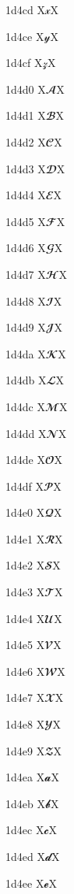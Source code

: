 \documentclass[11pt]{article}
\begin{document}
1d4cd X{\ensuremath{\mathscr{x}}}X

1d4ce X{\ensuremath{\mathscr{y}}}X

1d4cf X{\ensuremath{\mathscr{z}}}X

1d4d0 X{\ensuremath{\mathbfscr{A}}}X

1d4d1 X{\ensuremath{\mathbfscr{B}}}X

1d4d2 X{\ensuremath{\mathbfscr{C}}}X

1d4d3 X{\ensuremath{\mathbfscr{D}}}X

1d4d4 X{\ensuremath{\mathbfscr{E}}}X

1d4d5 X{\ensuremath{\mathbfscr{F}}}X

1d4d6 X{\ensuremath{\mathbfscr{G}}}X

1d4d7 X{\ensuremath{\mathbfscr{H}}}X

1d4d8 X{\ensuremath{\mathbfscr{I}}}X

1d4d9 X{\ensuremath{\mathbfscr{J}}}X

1d4da X{\ensuremath{\mathbfscr{K}}}X

1d4db X{\ensuremath{\mathbfscr{L}}}X

1d4dc X{\ensuremath{\mathbfscr{M}}}X

1d4dd X{\ensuremath{\mathbfscr{N}}}X

1d4de X{\ensuremath{\mathbfscr{O}}}X

1d4df X{\ensuremath{\mathbfscr{P}}}X

1d4e0 X{\ensuremath{\mathbfscr{Q}}}X

1d4e1 X{\ensuremath{\mathbfscr{R}}}X

1d4e2 X{\ensuremath{\mathbfscr{S}}}X

1d4e3 X{\ensuremath{\mathbfscr{T}}}X

1d4e4 X{\ensuremath{\mathbfscr{U}}}X

1d4e5 X{\ensuremath{\mathbfscr{V}}}X

1d4e6 X{\ensuremath{\mathbfscr{W}}}X

1d4e7 X{\ensuremath{\mathbfscr{X}}}X

1d4e8 X{\ensuremath{\mathbfscr{Y}}}X

1d4e9 X{\ensuremath{\mathbfscr{Z}}}X

1d4ea X{\ensuremath{\mathbfscr{a}}}X

1d4eb X{\ensuremath{\mathbfscr{b}}}X

1d4ec X{\ensuremath{\mathbfscr{c}}}X

1d4ed X{\ensuremath{\mathbfscr{d}}}X

1d4ee X{\ensuremath{\mathbfscr{e}}}X
\end{document}
